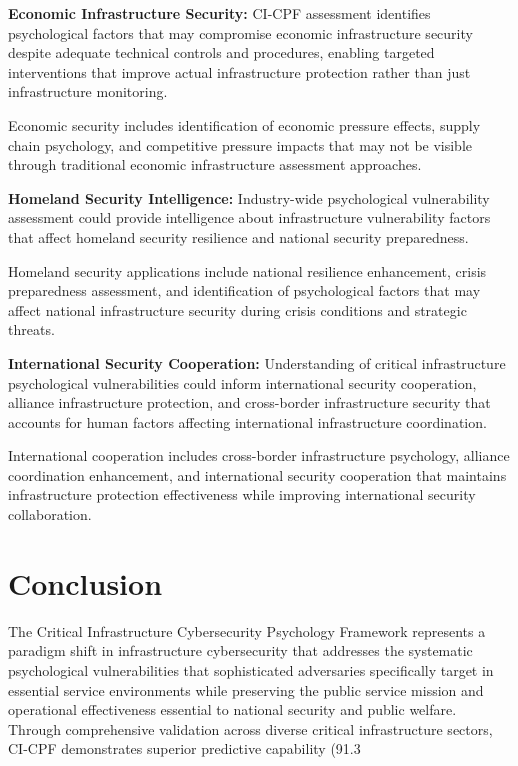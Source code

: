 \documentclass[10pt, twocolumn]{article}
\begin{document}
\textbf{Economic Infrastructure Security:} CI-CPF assessment identifies psychological factors that may compromise economic infrastructure security despite adequate technical controls and procedures, enabling targeted interventions that improve actual infrastructure protection rather than just infrastructure monitoring.

Economic security includes identification of economic pressure effects, supply chain psychology, and competitive pressure impacts that may not be visible through traditional economic infrastructure assessment approaches.

\textbf{Homeland Security Intelligence:} Industry-wide psychological vulnerability assessment could provide intelligence about infrastructure vulnerability factors that affect homeland security resilience and national security preparedness.

Homeland security applications include national resilience enhancement, crisis preparedness assessment, and identification of psychological factors that may affect national infrastructure security during crisis conditions and strategic threats.

\textbf{International Security Cooperation:} Understanding of critical infrastructure psychological vulnerabilities could inform international security cooperation, alliance infrastructure protection, and cross-border infrastructure security that accounts for human factors affecting international infrastructure coordination.

International cooperation includes cross-border infrastructure psychology, alliance coordination enhancement, and international security cooperation that maintains infrastructure protection effectiveness while improving international security collaboration.

\section{Conclusion}

The Critical Infrastructure Cybersecurity Psychology Framework represents a paradigm shift in infrastructure cybersecurity that addresses the systematic psychological vulnerabilities that sophisticated adversaries specifically target in essential service environments while preserving the public service mission and operational effectiveness essential to national security and public welfare. Through comprehensive validation across diverse critical infrastructure sectors, CI-CPF demonstrates superior predictive capability (91.3%
\end{document}
